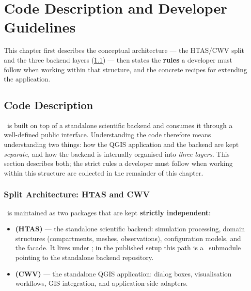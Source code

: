 \chapter{Code Description and Developer Guidelines}
\label{chap-dev}

\renewcommand{\headrulewidth}{0.3pt}
\fancyhead[LE]{\thepage} \fancyhead[RE]{\nouppercase{\textbf{\leftmark}}}
\fancyhead[RO]{\thepage} \fancyhead[LO]{\nouppercase{\textbf{\rightmark}}}
\fancyfoot[L,C,R]{}

\setlength{\parindent}{0.35cm}

\minitoc
\newpage

This chapter first describes the conceptual architecture --- the HTAS/CWV split and the three backend layers (\cref{chap-description-src}) --- then states the \textbf{rules} a developer must follow when working within that structure, and the concrete recipes for extending the application.

\section{Code Description}
\label{chap-description-src}

\cwv~is built on top of a standalone scientific backend and consumes it through a well-defined public interface. Understanding the code therefore means understanding two things: how the QGIS application and the backend are kept \emph{separate}, and how the backend is internally organised into \emph{three layers}. This section describes both; the strict rules a developer must follow when working within this structure are collected in the remainder of this chapter.

\subsection{Split Architecture: HTAS and CWV}
\label{sec-split}

\cwv~is maintained as two packages that are kept \textbf{strictly independent}:

\begin{itemize}
    \item \textbf{ (HTAS)} --- the standalone scientific backend: simulation processing, domain structures (compartments, meshes, observations), configuration models, and the  facade. It lives under ; in the published setup this path is a \gitlab~submodule pointing to the standalone backend repository.
    \item \textbf{ (CWV)} --- the standalone QGIS application: dialog boxes, visualisation workflows, GIS integration, and application-side adapters.
\end{itemize}

